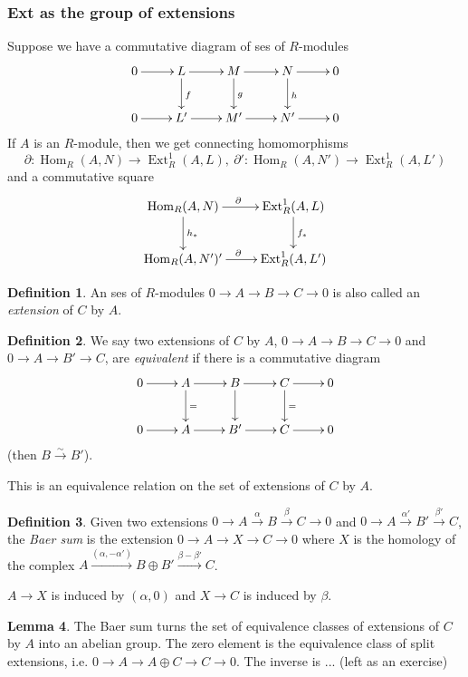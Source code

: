 \documentclass{article}
\newcommand{\Hom}{\operatorname{Hom}}
\newcommand{\Ext}{\operatorname{Ext}}
\theoremstyle{definition}
\newtheorem{defn}{Definition}[subsection]
\newtheorem{lemma}[defn]{Lemma}
\begin{document}
\subsubsection{Ext as the group of extensions}
Suppose we have a commutative diagram of ses of $R$-modules
\[
\xymatrix{
0\ar[r] & L\ar[r]\ar[d]^f & M\ar[r]\ar[d]^g & N\ar[r]\ar[d]^h & 0 \\
0\ar[r] & L'\ar[r] & M'\ar[r] & N'\ar[r] & 0 
}
\]
If $A$ is an $R$-module, then we get connecting homomorphisms
\[
\partial:\Hom_R(A,N)\rightarrow\Ext_R^1(A,L),\ \partial':\Hom_R(A,N')\rightarrow\Ext_R^1(A,L')
\]
and a commutative square
\[
\xymatrix{
\Hom_R(A,N)\ar[r]^\partial\ar[d]^{h_\ast} & \Ext_R^1(A,L)\ar[d]^{f_\ast} \\
\Hom_R(A,N')\ar[r]^\partial' & \Ext_R^1(A,L')
}
\]

\begin{defn}
An ses of $R$-modules $0\rightarrow A\rightarrow B\rightarrow C\rightarrow 0$ is also called an \textit{extension} of $C$ by $A$.
\end{defn}

\begin{defn}
We say two extensions of $C$ by $A$, $0\rightarrow A\rightarrow B\rightarrow C\rightarrow 0$ and $0\rightarrow A\rightarrow B'\rightarrow C$, are \textit{equivalent} if there is a commutative diagram
\[
\xymatrix{
0\ar[r] & A\ar[r]\ar[d]^= & B\ar[r]\ar[d] & C\ar[r]\ar[d]^= & 0 \\
0\ar[r] & A\ar[r] & B'\ar[r] & C\ar[r] & 0 
}
\]
(then $B\xrightarrow{\sim}B'$).

This is an equivalence relation on the set of extensions of $C$ by $A$.
\end{defn}

\begin{defn}
Given two extensions $0\rightarrow A\xrightarrow{\alpha} B\xrightarrow{\beta} C\rightarrow 0$ and $0\rightarrow A\xrightarrow{\alpha'} B'\xrightarrow{\beta'} C$, the \textit{Baer sum} is the extension $0\rightarrow A\rightarrow X\rightarrow C\rightarrow 0$ where $X$ is the homology of the complex $A\xrightarrow{(\alpha,-\alpha')}B\oplus B'\xrightarrow{\beta-\beta'}C$.

$A\rightarrow X$ is induced by $(\alpha,0)$ and $X\rightarrow C$ is induced by $\beta$.
\end{defn}

\begin{lemma}
The Baer sum turns the set of equivalence classes of extensions of $C$ by $A$ into an abelian group. The zero element is the equivalence class of split extensions, i.e. $0\rightarrow A\rightarrow A\oplus C\rightarrow C\rightarrow 0$. The inverse is ... (left as an exercise)
\end{lemma}
\end{document}
